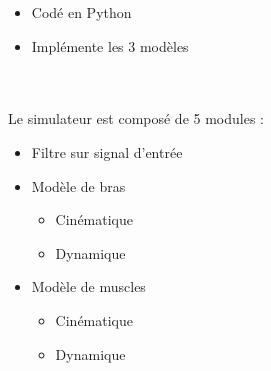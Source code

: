 \documentclass[pdftex,a4paper,11pt]{article}
\begin{document}
\begin{itemize}
    \item Codé en Python
    \item Implémente les 3 modèles
\end{itemize}

\begin{figure}
    \centering
    ~~~
    ~~~
    ~~~
\end{figure}

\paragraph{}
Le simulateur est composé de 5 modules :
\begin{itemize}
    \item Filtre sur signal d'entrée
    \item Modèle de bras
    \begin{itemize}
        \item Cinématique
        \item Dynamique
    \end{itemize}
    \item Modèle de muscles
    \begin{itemize}
        \item Cinématique
        \item Dynamique
    \end{itemize}
\end{itemize}
\end{document}
